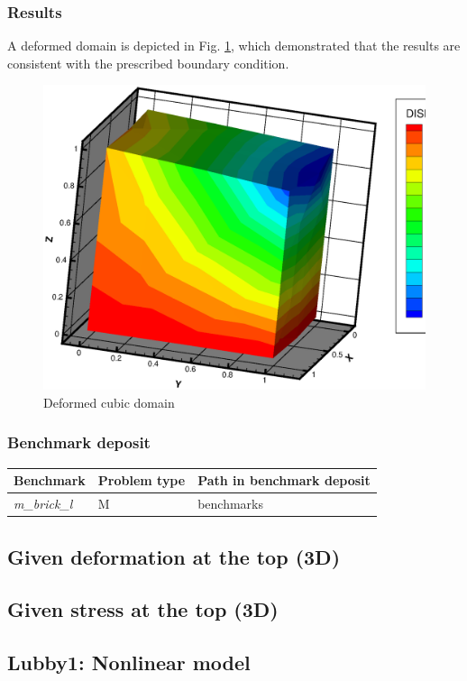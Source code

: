 \subsubsection*{Results}
A deformed domain is depicted in Fig. \ref{fig:brick_d}, which demonstrated that the results
  are consistent with the prescribed boundary condition.
 \begin{figure}[!htb]
  \begin{center}
    \includegraphics[scale=0.4]{M/brick_l_d.eps}
  \end{center}
  \caption{Deformed cubic domain}
  \label{fig:brick_d}
\end{figure}
\subsubsection*{Benchmark deposit}
\begin{tabular}{|l|l|l|}
  \hline
  Benchmark & Problem type & Path in benchmark deposit \\
  \hline
 \emph{m\_brick\_l} & M & benchmarks\verb \M\ \\
  \hline
\end{tabular}

\clearpage

\subsection{Given deformation at the top (3D)}


\clearpage

\subsection{Given stress at the top (3D)}


\clearpage

\subsection{Lubby1: Nonlinear model}
\label{subsec:lubby1}

